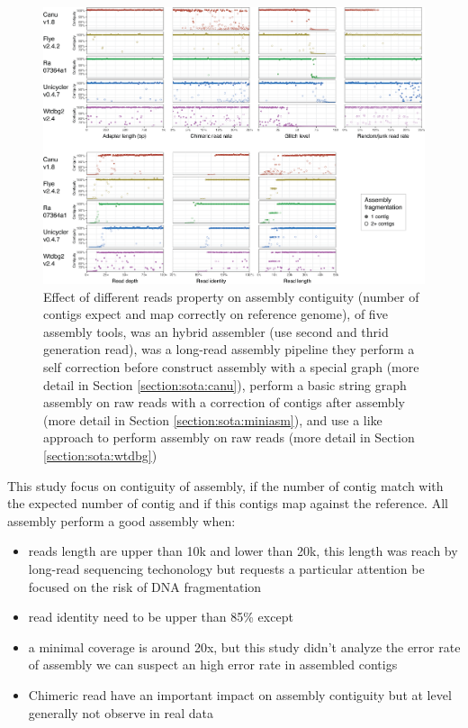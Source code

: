 \documentclass[./main.tex]{subfiles}
\begin{document}
\begin{figure}
    \centering
    \includegraphics[width=\textwidth]{introduction/images/rrwick_bench.png}
    \caption{Effect of different reads property on assembly contiguity (number of contigs expect and map correctly on reference genome), of five assembly tools,  was an hybrid assembler (use second and thrid generation read), \canu was a long-read assembly pipeline they perform a self correction before construct assembly with a special \OLC graph (more detail in Section \ref{section:sota:canu}),  perform a basic string graph assembly on raw reads with a correction of contigs after assembly (more detail in Section \ref{section:sota:miniasm}), \wtdbg and  use a \DBG like approach to perform assembly on raw reads (more detail in Section \ref{section:sota:wtdbg})}
    \label{intro:fig:rrwick_bench}
\end{figure}

This study focus on contiguity of assembly, if the number of contig match with the expected number of contig and if this contigs map against the reference. All assembly perform a good assembly when:
\begin{itemize}
    \item reads length are upper than 10k and lower than 20k, this length was reach by long-read sequencing techonology but requests a particular attention be focused on the risk of DNA fragmentation
    \item read identity need to be upper than 85\% except
    \item a minimal coverage is around 20x, but this study didn't analyze the error rate of assembly we can suspect an high error rate in assembled contigs
    \item Chimeric read have an important impact on assembly contiguity but at level generally not observe in real data
\end{itemize}
\end{document}
